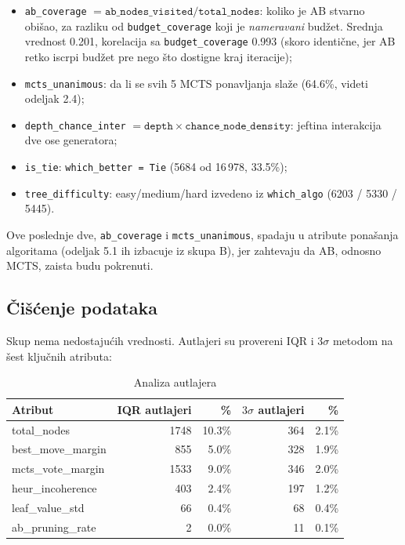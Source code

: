 \documentclass[12pt, a4paper]{article}
\begin{document}
\begin{itemize}[noitemsep]
    \item \texttt{ab\_coverage} $= \mathtt{ab\_nodes\_visited} / \mathtt{total\_nodes}$:
    koliko je AB stvarno obišao, za razliku od \texttt{budget\_coverage} koji je
    \textit{nameravani} budžet. Srednja vrednost 0.201, korelacija sa \texttt{budget\_coverage}
    0.993 (skoro identične, jer AB retko iscrpi budžet pre nego što dostigne kraj iteracije);
    \item \texttt{mcts\_unanimous}: da li se svih 5 MCTS ponavljanja slaže (64.6\%, videti
    odeljak 2.4);
    \item \texttt{depth\_chance\_inter} $= \mathtt{depth} \times \mathtt{chance\_node\_density}$:
    jeftina interakcija dve ose generatora;
    \item \texttt{is\_tie}: \texttt{which\_better = Tie} (5684 od 16\,978, 33.5\%);
    \item \texttt{tree\_difficulty}: easy/medium/hard izvedeno iz \texttt{which\_algo}
    (6203 / 5330 / 5445).
\end{itemize}

Ove poslednje dve, \texttt{ab\_coverage} i \texttt{mcts\_unanimous}, spadaju u atribute
ponašanja algoritama (odeljak 5.1 ih izbacuje iz skupa B), jer zahtevaju da AB, odnosno MCTS,
zaista budu
pokrenuti.

\subsection{Čišćenje podataka}

Skup nema nedostajućih vrednosti. Autlajeri su provereni IQR i $3\sigma$ metodom na šest
ključnih atributa:

\begin{table}[H]
\centering
\caption{Analiza autlajera}
\begin{tabular}{lrrrr}
\toprule
\textbf{Atribut} & \textbf{IQR autlajeri} & \textbf{\%} & \textbf{$3\sigma$ autlajeri} & \textbf{\%} \\
\midrule
total\_nodes       & 1748 & 10.3\% & 364 & 2.1\% \\
best\_move\_margin & 855  & 5.0\%  & 328 & 1.9\% \\
mcts\_vote\_margin & 1533 & 9.0\%  & 346 & 2.0\% \\
heur\_incoherence  & 403  & 2.4\%  & 197 & 1.2\% \\
leaf\_value\_std   & 66   & 0.4\%  & 68  & 0.4\% \\
ab\_pruning\_rate  & 2    & 0.0\%  & 11  & 0.1\% \\
\bottomrule
\end{tabular}
\end{table}
\end{document}
